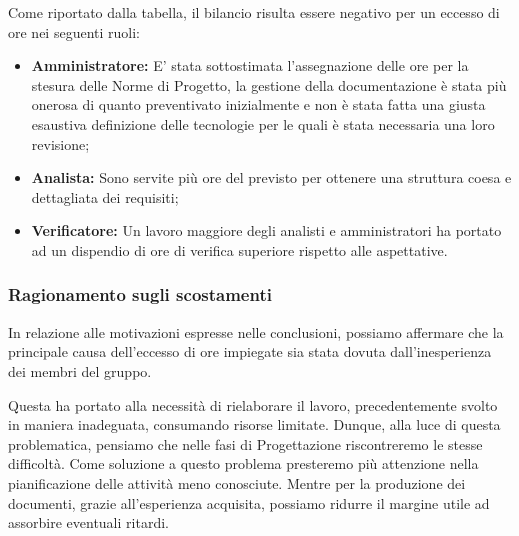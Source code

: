 Come riportato dalla tabella, il bilancio risulta essere negativo per un eccesso di ore nei seguenti ruoli:

\begin{itemize}
	\item \textbf{Amministratore:} E' stata sottostimata l'assegnazione delle ore per la stesura delle Norme di Progetto, la gestione della documentazione è stata più onerosa di quanto preventivato inizialmente e non è stata fatta una giusta esaustiva definizione delle tecnologie per le quali è stata necessaria una loro revisione;
	\item \textbf{Analista:} Sono servite più ore del previsto per ottenere una struttura coesa e dettagliata dei requisiti;
	\item \textbf{Verificatore:} Un lavoro maggiore degli analisti e amministratori ha portato ad un dispendio di ore di verifica superiore rispetto alle aspettative.
\end{itemize}
\subsubsection{Ragionamento sugli scostamenti}

In relazione alle motivazioni espresse nelle conclusioni, possiamo affermare che la principale causa dell'eccesso di ore impiegate sia stata dovuta dall'inesperienza dei membri del gruppo. 

Questa ha portato alla necessità di rielaborare il lavoro, precedentemente svolto in maniera inadeguata, consumando risorse limitate.
Dunque, alla luce di questa problematica, pensiamo che nelle fasi di Progettazione riscontreremo le stesse difficoltà. Come soluzione a questo problema presteremo più attenzione nella pianificazione delle attività meno conosciute. Mentre per la produzione dei documenti, grazie all'esperienza acquisita, possiamo ridurre il margine utile ad assorbire eventuali ritardi.

